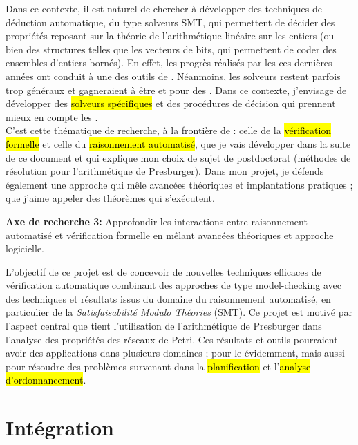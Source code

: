 Dans ce contexte, il est naturel de chercher à développer des techniques de
déduction automatique, du type solveurs SMT, qui permettent de décider des
propriétés reposant sur la théorie de l'arithmétique linéaire sur les entiers
(ou bien des structures telles que les vecteurs de bits, qui permettent de coder
des ensembles d'entiers bornés).
En effet, les progrès réalisés par les  ces dernières années
ont conduit à une  des outils de .
Néanmoins, les solveurs restent parfois trop généraux et gagneraient à être
 et  pour des . Dans ce
contexte, j'envisage de développer des \hl{solveurs spécifiques} et des
procédures de décision qui prennent mieux en compte les .\\

C'est cette thématique de recherche, à la frontière de  :
celle de la \hl{vérification formelle} et celle du \hl{raisonnement automatisé},
que je vais développer dans la suite de ce document et qui explique mon choix de
sujet de postdoctorat (méthodes de résolution pour l'arithmétique de
Presburger). Dans mon projet, je défends également une approche qui mêle
avancées théoriques et implantations pratiques ; que j'aime appeler des \og théorèmes qui
s'exécutent\fg.\\


\begin{mdframed}
    \textbf{\textbf{Axe de recherche 3:}} Approfondir les interactions entre
    raisonnement automatisé et vérification formelle en mêlant avancées
    théoriques et approche logicielle.
\end{mdframed}

L'objectif de ce projet est de concevoir de
nouvelles techniques efficaces de vérification automatique combinant des
approches de type model-checking avec des techniques et résultats issus du
domaine du raisonnement automatisé, en particulier de la \emph{Satisfaisabilité
Modulo Théories} (SMT). Ce projet est motivé par l'aspect central que tient
l'utilisation de l'arithmétique de Presburger dans l'analyse des propriétés
des réseaux de Petri. 
Ces résultats et outils pourraient avoir des applications dans plusieurs
domaines ; pour le  évidemment, mais aussi pour résoudre des
problèmes survenant dans la \hl{planification} et l'\hl{analyse
d'ordonnancement}.

\vspace{10pt}
\section*{Intégration}
\vspace{10pt}

